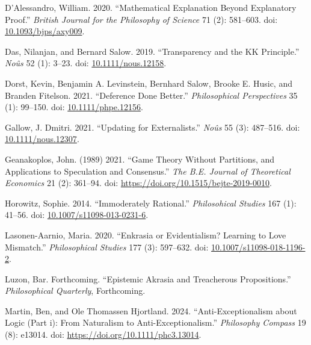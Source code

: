 \documentclass[
  11pt,
  letterpaper,
  DIV=11,
  numbers=noendperiod,
  twoside]{scrartcl}
\newlength{\cslhangindent}
\newenvironment{CSLReferences}[2] %
 {\begin{list}{}{%
  \setlength{\itemindent}{0pt}
  \setlength{\leftmargin}{0pt}
  \setlength{\parsep}{0pt}
  \ifodd #1
   \setlength{\leftmargin}{\cslhangindent}
   \setlength{\itemindent}{-1\cslhangindent}
  \fi
  \setlength{\itemsep}{#2\baselineskip}}}
 {\end{list}}
\begin{document}
\label{refs}
\begin{CSLReferences}{1}{0}
D'Alessandro, William. 2020. {``Mathematical Explanation Beyond
Explanatory Proof.''} \emph{British Journal for the Philosophy of
Science} 71 (2): 581--603. doi:
\href{https://doi.org/10.1093/bjps/axy009}{10.1093/bjps/axy009}.

Das, Nilanjan, and Bernard Salow. 2019. {``Transparency and the {KK}
Principle.''} \emph{No{û}s} 52 (1): 3--23. doi:
\href{https://doi.org/10.1111/nous.12158}{10.1111/nous.12158}.

Dorst, Kevin, Benjamin A. Levinstein, Bernhard Salow, Brooke E. Husic,
and Branden Fitelson. 2021. {``Deference Done Better.''}
\emph{Philosophical Perspectives} 35 (1): 99--150. doi:
\href{https://doi.org/10.1111/phpe.12156}{10.1111/phpe.12156}.

Gallow, J. Dmitri. 2021. {``Updating for Externalists.''} \emph{Noûs} 55
(3): 487--516. doi:
\href{https://doi.org/10.1111/nous.12307}{10.1111/nous.12307}.

Geanakoplos, John. (1989) 2021. {``Game Theory Without Partitions, and
Applications to Speculation and Consensus.''} \emph{The B.E. Journal of
Theoretical Economics} 21 (2): 361--94. doi:
\url{https://doi.org/10.1515/bejte-2019-0010}.

Horowitz, Sophie. 2014. {``Immoderately Rational.''} \emph{Philosohical
Studies} 167 (1): 41--56. doi:
\href{https://doi.org/10.1007/s11098-013-0231-6}{10.1007/s11098-013-0231-6}.

Lasonen-Aarnio, Maria. 2020. {``Enkrasia or Evidentialism? Learning to
Love Mismatch.''} \emph{Philosophical Studies} 177 (3): 597--632. doi:
\href{https://doi.org/10.1007/s11098-018-1196-2}{10.1007/s11098-018-1196-2}.

Luzon, Bar. Forthcoming. {``Epistemic Akrasia and Treacherous
Propositions.''} \emph{Philosophical Quarterly}, Forthcoming.

Martin, Ben, and Ole Thomassen Hjortland. 2024. {``Anti-Exceptionalism
about Logic (Part i): From Naturalism to Anti-Exceptionalism.''}
\emph{Philosophy Compass} 19 (8): e13014. doi:
\url{https://doi.org/10.1111/phc3.13014}.


\end{CSLReferences}
\end{document}
